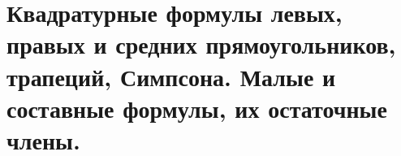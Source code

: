 \documentclass[../../calc-math-exam-2023.tex]{subfiles}
\begin{document}
    \section{Квадратурные формулы левых, правых и средних прямоугольников, трапеций, Симпсона. Малые и составные формулы, их остаточные члены.}\label{sec:ch09}
\end{document}
